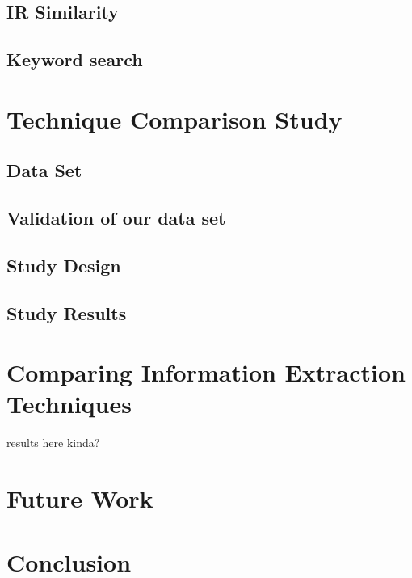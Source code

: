 \documentclass[\myrootdir/main.tex]{subfiles}
\begin{document}
\section{IR Similarity}

\section{Keyword search}

\chapter{Technique Comparison Study}

\section{Data Set}

\section{Validation of our data set}

\section{Study Design}

\section{Study Results}

\chapter{Comparing Information Extraction Techniques}
results here kinda?

\chapter{Future Work}

\chapter{Conclusion}
\end{document}
